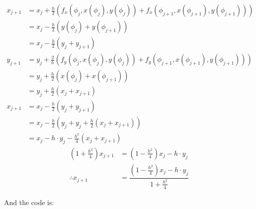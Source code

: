 \documentclass{article}
\begin{document}
\begin{enumerate}
\begin{itemize}
\begin{align*}
x_{j+1}&= x_j+ \frac{h}{2} \left(f_x(\phi_j, x(\phi_j),y(\phi_j))+ f_x(\phi_{j+1}, x(\phi_{j+1}),y(\phi_{j+1}))\right)\\
&=x_j - \frac{h}{2} \left(y(\phi_{j})+ y(\phi_{j+1})\right)\\
&=x_j - \frac{h}{2} \left(y_{j}+ y_{j+1}\right)\\
y_{j+1}&= y_j+ \frac{2}{h} \left(f_y(\phi_j, x(\phi_j),y(\phi_j))+ f_y(\phi_{j+1}, x(\phi_{j+1}),y(\phi_{j+1}))\right)\\
&=y_j+\frac{h}{2} \left(x(\phi_{j})+ x(\phi_{j+1})\right)\\
&=y_j+\frac{h}{2} \left(x_{j}+ x_{j+1}\right)\\
x_{j+1}&= x_j - \frac{h}{2} \left(y_{j}+ y_{j+1}\right)\\
&= x_j - \frac{h}{2} \left(y_{j}+ y_j+\frac{h}{2} \left(x_{j}+ x_{j+1}\right)\right)\\
&=x_j - h \cdot y_j-\frac{h^2}{4}\left(x_{j}+ x_{j+1}\right)
\end{align*}\begin{align*}
\left(1+\frac{h^2}{4}\right)x_{j+1}&=\left(1-\frac{h^2}{4}\right)x_{j} - h \cdot y_j\\
\therefore x_{j+1}&=\dfrac{\left(1-\frac{h^2}{4}\right)x_{j} - h \cdot y_j}{1+\frac{h^2}{4}}
\end{align*}
\end{itemize}


And the code is: 
 
 

\end{enumerate}
\end{document}
